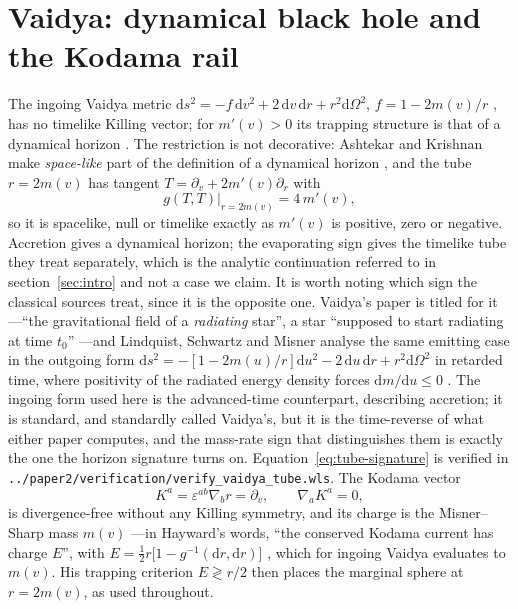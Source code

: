 \documentclass[12pt]{iopart}
\newcommand{\dd}{\mathrm{d}}
\theoremstyle{plain}
\theoremstyle{definition}
\theoremstyle{plain}
\theoremstyle{remark}
\begin{document}
\section{Vaidya: dynamical black hole and the Kodama rail}
\label{sec:vaidya}
The ingoing Vaidya metric $\dd s^2=-f\,\dd v^2+2\,\dd v\,\dd r+r^2\dd\Omega^2$,
$f=1-2m(v)/r$ \cite{Vaidya1951}, has no timelike
Killing vector; for $m'(v)>0$ its trapping structure is that of a dynamical horizon
\cite{AshtekarKrishnan2003,Booth2005,FaraoniBook}. The restriction is not
decorative: Ashtekar and Krishnan make \emph{space-like} part of the definition of a
dynamical horizon \cite[Def.~1]{AshtekarKrishnan2003}, and the tube $r=2m(v)$ has
tangent $T=\partial_v+2m'(v)\partial_r$ with
\begin{equation}
    g(T,T)\big|_{r=2m(v)}=4\,m'(v) ,
    \label{eq:tube-signature}
\end{equation}
so it is spacelike, null or timelike exactly as $m'(v)$ is positive, zero or
negative. Accretion gives a dynamical horizon; the evaporating sign gives the
timelike tube they treat separately, which is the analytic continuation referred to
in section~\ref{sec:intro} and not a case we claim. It is worth noting which sign
the classical sources treat, since it is the opposite one. Vaidya's paper is
titled for it---``the gravitational field of a \emph{radiating} star'', a star
``supposed to start radiating at time $t_0$'' \cite[\S3]{Vaidya1951}---and
Lindquist, Schwartz and Misner analyse the same emitting case in the outgoing form
$\dd s^2=-[1-2m(u)/r]\dd u^2-2\,\dd u\,\dd r+r^2\dd\Omega^2$ in retarded time,
where positivity of the radiated energy density forces $\dd m/\dd u\le0$
\cite[\S III]{LindquistSchwartzMisner1965}. The ingoing form used here is the
advanced-time counterpart, describing accretion; it is standard, and standardly
called Vaidya's, but it is the time-reverse of what either paper computes, and the
mass-rate sign that distinguishes them is exactly the one the horizon signature
turns on.
Equation~\eqref{eq:tube-signature} is verified in
\texttt{../paper2/verification/verify\_vaidya\_tube.wls}. The Kodama vector
\cite{Kodama1980,Hayward1996,AbreuVisser2010}
\begin{equation}
    K^a=\varepsilon^{ab}\nabla_b r = \partial_v ,\qquad
    \nabla_a K^a=0,
    \label{eq:kodama}
\end{equation}
is divergence-free without any Killing symmetry, and its charge is the
Misner--Sharp mass $m(v)$ \cite{MisnerSharp1964,HaywardMukohyama1999}---in
Hayward's words, ``the conserved Kodama current has charge $E$'', with
$E=\tfrac12r\big[1-g^{-1}(\dd r,\dd r)\big]$ \cite[Eq.~(4)]{Hayward1996}, which for
ingoing Vaidya evaluates to $m(v)$. His trapping criterion $E\gtrless r/2$ then
places the marginal sphere at $r=2m(v)$, as used throughout.
\end{document}
